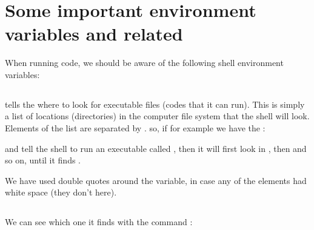\documentclass[letterpaper,10pt,english]{sphinxmanual}
\begin{document}
\section{Some important environment variables and related}
\label{\detokenize{Appendix1:Some-important-environment-variables-and-related}}
When running  code, we should be aware of the following shell environment variables:

\begin{sphinxVerbatim}[commandchars=\\\{\}]
\end{sphinxVerbatim}


\subsection{}
\label{\detokenize{Appendix1:PATH}}
 tells the  where to look for executable files (codes that it can run). This is simply a list of locations (directories) in the computer file system that the shell will look. Elements of the list are separated by \sphinxcode{\sphinxupquote{:}}. so, if for example we have the :

\begin{sphinxVerbatim}[commandchars=\\\{\}]
\end{sphinxVerbatim}

and tell the shell to run an executable called , then it will first look in , then  and so on, until it finds .

We have used double quotes  around the variable, in case any of the elements had white space (they don’t here).


\subsection{}
\label{\detokenize{Appendix1:which}}
We can see which one it finds with the command :
\end{document}
